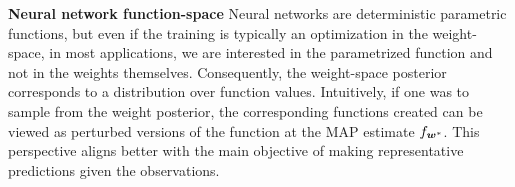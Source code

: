 \documentclass{article} %
\begin{document}
\textbf{Neural network function-space} %
Neural networks are deterministic parametric functions, but even if the training is typically an optimization in the weight-space, in most applications, we are interested in the parametrized function and not in the weights themselves.
Consequently, the weight-space posterior corresponds to a distribution over function values.
Intuitively, if one was to sample from the weight posterior, the corresponding functions created can be viewed as perturbed versions of the function at the MAP estimate $f_{{\bm{w}}^*}$. This perspective aligns better with the main objective of making representative predictions given the observations.
\end{document}
